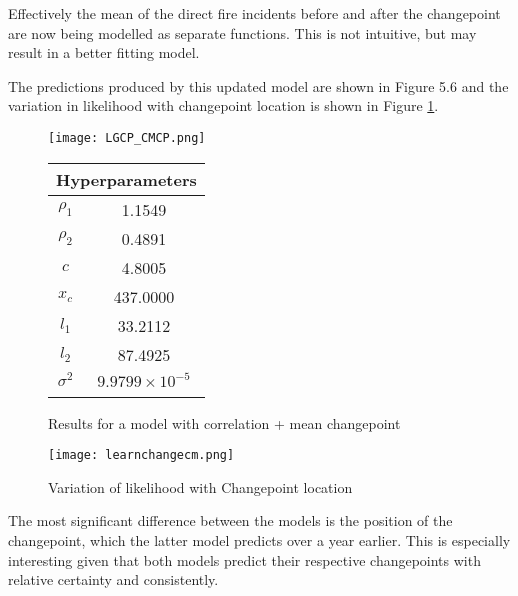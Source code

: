 \documentclass[a4paper,11pt]{report}
\begin{document}
Effectively the mean of the direct fire incidents before and after the changepoint are now being modelled as separate functions. This is not intuitive, but may result in a better fitting model. \par

The predictions produced by this updated model are shown in Figure 5.6 and the variation in likelihood with changepoint location is shown in Figure \ref{fig:cmcpvariation}. 
  \begin{figure}[!ht]
    \centering
    \texttt{[image: LGCP\_CMCP.png]}
    \qquad
    \doublespacing
    \begin{tabular}[b]{cc}
    \multicolumn{2}{c}{\textbf{Hyperparameters}}                                            \\ \hline
      \(\rho_1\)                    & 1.1549                \\                       
\(\rho_2\)                     & 0.4891                           \\            
\(c\)                               & 4.8005                                      \\ 
\(x_c\)                        & 437.0000                                         \\ 
\(l_1\)                               & 33.2112                                      \\  
\(l_2\) & 87.4925 \\ 
\(\sigma^2\) & \(9.9799 \times 10^{-5}\) \\ 
& \\
    \end{tabular}
    \captionsetup{labelformat=andtable}
    \caption{Results for a model with correlation + mean changepoint}
  \end{figure}
  
\begin{figure}
\centering
\texttt{[image: learnchangecm.png]}
\caption{Variation of likelihood with Changepoint location}
\label{fig:cmcpvariation}
\end{figure}

The most significant difference between the models is the position of the changepoint, which the latter model predicts over a year earlier. This is especially interesting given that both models predict their respective changepoints with relative certainty and consistently. \par
\end{document}
